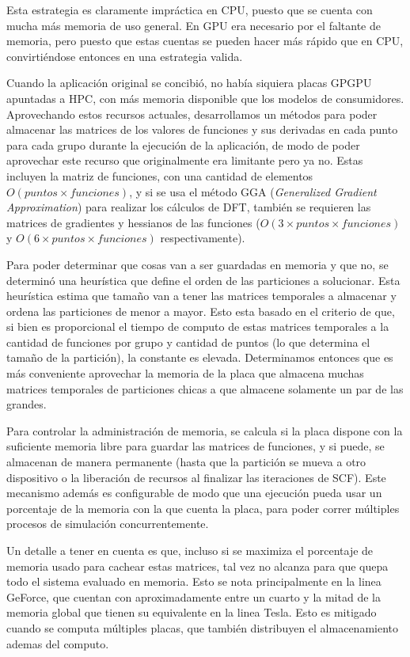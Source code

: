 Esta estrategia es claramente impr\'actica en CPU, puesto que se cuenta con mucha m\'as memoria
de uso general. En GPU era necesario por el faltante de memoria, pero puesto que estas cuentas se pueden
hacer m\'as r\'apido que en CPU, convirti\'endose entonces en una estrategia valida.

Cuando la aplicaci\'on original se concibi\'o, no hab\'ia siquiera placas GPGPU apuntadas a HPC, con
m\'as memoria disponible que los modelos de consumidores. Aprovechando estos recursos actuales,
desarrollamos un m\'etodos para poder almacenar las matrices de los valores de funciones y sus derivadas
en cada punto para cada grupo durante la ejecuci\'on de la aplicaci\'on, de modo de poder aprovechar
este recurso que originalmente era limitante pero ya no. Estas incluyen la matriz de funciones,
con una cantidad de elementos $O(puntos \times funciones)$, y si se usa el m\'etodo GGA
(\textit{Generalized Gradient Approximation}) para realizar los c\'alculos de DFT, tambi\'en se requieren
las matrices de gradientes y hessianos de las funciones ($O(3 \times puntos \times funciones)$ y
$O(6 \times puntos \times funciones)$ respectivamente).

Para poder determinar que cosas van a ser guardadas en memoria y que no, se determin\'o una heur\'istica
que define el orden de las particiones a solucionar. Esta heur\'istica estima que tama\~no van a
tener las matrices temporales a almacenar y ordena las particiones de menor a mayor. Esto
esta basado en el criterio de que, si bien es proporcional el tiempo de computo de estas matrices
temporales a la cantidad de funciones por grupo y cantidad de puntos (lo que determina el tama\~no
de la partici\'on), la constante es elevada. Determinamos entonces que es m\'as conveniente
aprovechar la memoria de la placa que almacena muchas matrices temporales de particiones chicas
a que almacene solamente un par de las grandes.

Para controlar la administraci\'on de memoria, se calcula si la placa dispone
con la suficiente memoria libre para guardar las matrices de funciones, y si puede, se almacenan de manera
permanente (hasta que la partici\'on se mueva a otro dispositivo o la liberaci\'on de recursos al
finalizar las iteraciones de SCF). Este mecanismo adem\'as es configurable de modo que una ejecuci\'on
pueda usar un porcentaje de la memoria con la que cuenta la placa, para poder correr m\'ultiples procesos de
simulaci\'on concurrentemente.

Un detalle a tener en cuenta es que, incluso si se maximiza el porcentaje de memoria usado para
cachear estas matrices, tal vez no alcanza para que quepa todo el sistema evaluado en memoria. Esto
se nota principalmente en la linea GeForce, que cuentan con aproximadamente entre un cuarto y la mitad
de la memoria global que tienen su equivalente en la linea Tesla. Esto es mitigado cuando se computa
m\'ultiples placas, que tambi\'en distribuyen el almacenamiento ademas del computo.

